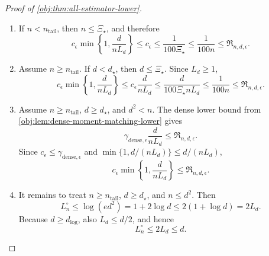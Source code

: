 \documentclass[11pt]{article}
\begin{document}
\begin{proof}[Proof of \cref{obj:thm:all-estimator-lower}]
\begin{enumerate}
\item
If \(n<n_{\mathrm{tail}}\), then \(n\le\Xi_\star\), and therefore
\[
c_\epsilon\min\left\{1,\frac{d}{nL_d}\right\}
\le c_\epsilon
\le\frac{1}{100\Xi_\star}
\le\frac{1}{100n}
\le\mathfrak R_{n,d,\epsilon}.
\]

\item
Assume \(n\ge n_{\mathrm{tail}}\).  If \(d<d_\star\), then
\(d\le\Xi_\star\).  Since \(L_d\ge1\),
\[
c_\epsilon\min\left\{1,\frac{d}{nL_d}\right\}
\le
c_\epsilon\frac{d}{nL_d}
\le
\frac{d}{100\Xi_\star nL_d}
\le
\frac{1}{100n}
\le
\mathfrak R_{n,d,\epsilon}.
\]

\item
Assume \(n\ge n_{\mathrm{tail}}\), \(d\ge d_\star\), and \(d^2<n\).  The
dense lower bound from \cref{obj:lem:dense-moment-matching-lower} gives
\[
\gamma_{\mathrm{dense},\epsilon}\frac{d}{nL_d}
\le
\mathfrak R_{n,d,\epsilon}.
\]
Since \(c_\epsilon\le\gamma_{\mathrm{dense},\epsilon}\) and
\(\min\{1,d/(nL_d)\}\le d/(nL_d)\),
\[
c_\epsilon\min\left\{1,\frac{d}{nL_d}\right\}
\le
\mathfrak R_{n,d,\epsilon}.
\]

\item
It remains to treat \(n\ge n_{\mathrm{tail}}\), \(d\ge d_\star\), and
\(n\le d^2\).  Then
\[
L_n^\circ
\le
\log(ed^2)
=
1+2\log d
\le
2(1+\log d)
=
2L_d.
\]
Because \(d\ge d_{\log}\), also \(L_d\le d/2\), and hence
\[
L_n^\circ\le2L_d\le d.
\]


\end{enumerate}
\end{proof}
\end{document}
